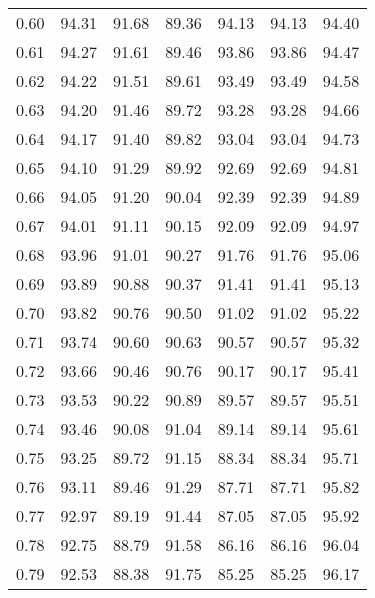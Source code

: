\begin{tabular}{|c|c|c|c|c|c|c|}
      0.60 &     94.31 &     91.68 &      89.36 &   94.13 &      94.13 &         94.40 \\
      0.61 &     94.27 &     91.61 &      89.46 &   93.86 &      93.86 &         94.47 \\
      0.62 &     94.22 &     91.51 &      89.61 &   93.49 &      93.49 &         94.58 \\
      0.63 &     94.20 &     91.46 &      89.72 &   93.28 &      93.28 &         94.66 \\
      0.64 &     94.17 &     91.40 &      89.82 &   93.04 &      93.04 &         94.73 \\
      0.65 &     94.10 &     91.29 &      89.92 &   92.69 &      92.69 &         94.81 \\
      0.66 &     94.05 &     91.20 &      90.04 &   92.39 &      92.39 &         94.89 \\
      0.67 &     94.01 &     91.11 &      90.15 &   92.09 &      92.09 &         94.97 \\
      0.68 &     93.96 &     91.01 &      90.27 &   91.76 &      91.76 &         95.06 \\
      0.69 &     93.89 &     90.88 &      90.37 &   91.41 &      91.41 &         95.13 \\
      0.70 &     93.82 &     90.76 &      90.50 &   91.02 &      91.02 &         95.22 \\
      0.71 &     93.74 &     90.60 &      90.63 &   90.57 &      90.57 &         95.32 \\
      0.72 &     93.66 &     90.46 &      90.76 &   90.17 &      90.17 &         95.41 \\
      0.73 &     93.53 &     90.22 &      90.89 &   89.57 &      89.57 &         95.51 \\
      0.74 &     93.46 &     90.08 &      91.04 &   89.14 &      89.14 &         95.61 \\
      0.75 &     93.25 &     89.72 &      91.15 &   88.34 &      88.34 &         95.71 \\
      0.76 &     93.11 &     89.46 &      91.29 &   87.71 &      87.71 &         95.82 \\
      0.77 &     92.97 &     89.19 &      91.44 &   87.05 &      87.05 &         95.92 \\
      0.78 &     92.75 &     88.79 &      91.58 &   86.16 &      86.16 &         96.04 \\
      0.79 &     92.53 &     88.38 &      91.75 &   85.25 &      85.25 &         96.17 \\

\end{tabular}

